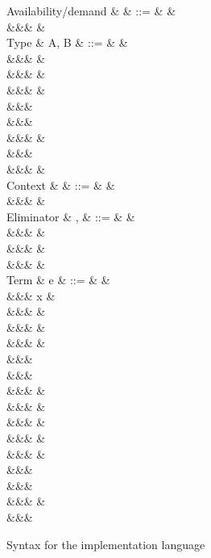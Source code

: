 \begin{figure}
\begin{syntaxfig}
\mbox{Availability/demand}
&
\alpha
&
::=
&
\top
&
\\
&&&
\bot
&
\\[2mm]
\mbox{Type}
&
A, B
&
::=
&
\bot
&
\\
&&&
\tyBool
&
\\
&&&
\tyInt
&
\\
&&&
&
\\
&&&
\\
&&&
\\
&&&
\tyList{\tyInt}
&
\\
&&&
\tyListProj{\tyInt}
\\
&&&
&
\\[2mm]
\mbox{Context}
&
\Gamma
&
::=
&
\cxtEmpty
&
\\
&&&
&
\\[2mm]
\mbox{Eliminator}
&
\sigma, \tau
&
::=
&
&
\\
&&&
&
\\
&&&
&
\\
&&&
&
\\[2mm]
\mbox{Term}
&
e
&
::=
&
\bot
&
\\
&&&
x
&
\\
&&&
\exTrue \mid \exFalse
&
\\
&&&
&
\\
&&&
&
\\
&&&
\\
&&&
\\
&&&
&
\\
&&&
&
\\
&&&
&
\\
&&&
\exNil
&
\\
&&&
&
\\
&&&
\\
&&&
\\
&&&
&
\\
&&&
\end{syntaxfig}
\caption{Syntax for the implementation language}
\label{fig:impl-language:syntax}
\end{figure}
